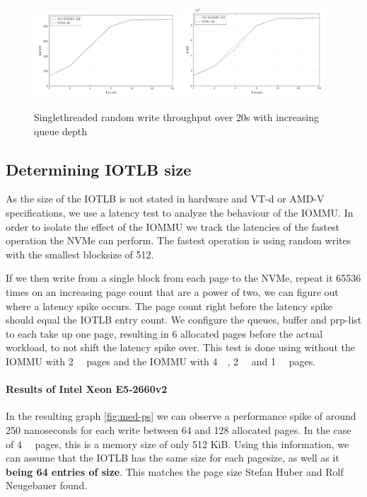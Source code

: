 \begin{figure}[H]
  \centering
   {\includegraphics[width=0.48\textwidth]{figures/qdnt1_1page}}
   {\includegraphics[width=0.48\textwidth]{figures/qdnt1_512page}}
  \caption{Singlethreaded random write throughput over 20s with increasing queue depth}
  \label{fig:qdnt1_4kib}
\end{figure}

\subsection{Determining IOTLB size}
As the size of the IOTLB is not stated in hardware and VT-d or AMD-V specifications, we use a latency test to analyze the behaviour of the IOMMU.
In order to isolate the effect of the IOMMU we track the latencies of the fastest operation the NVMe can perform. The fastest operation is using random writes with the smallest blocksize of \qty{512}{\byte}.

If we then write from a single block from each page to the NVMe, repeat it 65536 times on an increasing page count that are a power of two, we can figure out where a latency spike occurs. The page count right before the latency spike should equal the IOTLB entry count. We configure the queues, buffer and prp-list to each take up one page, resulting in 6 allocated pages before the actual workload, to not shift the latency spike over. This test is done using without the IOMMU with \qty{2}{\mebi\byte} pages and the IOMMU with \qty{4}{\kibi\byte}, \qty{2}{\mebi\byte} and \qty{1}{\gibi\byte} pages.

\paragraph{Results of Intel Xeon E5-2660v2}
In the resulting graph \autoref{fig:med-ps} we can observe a performance spike of around 250 nanoseconds for each write between 64 and 128 allocated pages. In the case of \qty{4}{\kibi\byte} pages, this is a memory size of only 512 KiB. Using this information, we can assume that the IOTLB has the same size for each pagesize, as well as it \textbf{being 64 entries of size}. This matches the page size Stefan Huber and Rolf Neugebauer found.

